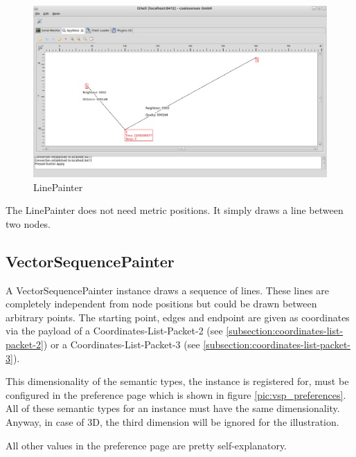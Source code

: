 \begin{figure}[htb]
  \begin{center}
    \includegraphics[width=13.2cm]{./pics/linepainter}
    \caption{LinePainter}
    \label{pic:lp}
  \end{center}
\end{figure}

The LinePainter does not need metric positions. It simply draws a line between two nodes.

\subsection{VectorSequencePainter}

A VectorSequencePainter instance draws a sequence of lines. These lines are completely independent from
node positions but could be drawn between arbitrary points. The starting point, edges and endpoint are given
as coordinates via the payload of a Coordinates-List-Packet-2 (see \ref{subsection:coordinates-list-packet-2}) or
a Coordinates-List-Packet-3 (see \ref{subsection:coordinates-list-packet-3}).

This dimensionality of the semantic types, the instance is registered for, must be configured in the preference page
which is shown in figure \ref{pic:vsp_preferences}. All of these semantic types for an instance must have
the same dimensionality. Anyway, in case of 3D, the third dimension will be ignored for the illustration.

All other values in the preference page are pretty self-explanatory.

